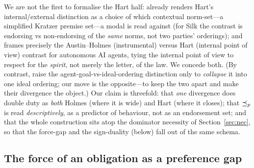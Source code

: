We are not the first to formalise the Hart half:  already renders Hart's
internal/external distinction as a choice of which contextual norm-set---a simplified
Kratzer premise set---a modal is read against (for Silk the contrast is endorsing vs
non-endorsing of the \emph{same} norms, not two parties' orderings); and 
frames precisely the Austin--Holmes (instrumental) versus Hart (internal point of view)
contrast for autonomous AI agents, tying the internal point of view to respect for the
\emph{spirit}, not merely the letter, of the law. We concede both. (By contrast,
 raise the agent-goal-vs-ideal-ordering distinction only to
\emph{collapse} it into one ideal ordering; our move is the opposite---to keep the two
apart and make their divergence the object.) Our claim is threefold: that
\emph{one} divergence does double duty as \emph{both} Holmes (where it is wide) and Hart
(where it closes); that $\preceq_{p}$ is read \emph{descriptively}, as a predictor of
behaviour, not as an endorsement set; and that the whole construction sits atop the
dominator necessity of Section~\ref{sec:nec}, so that the force-gap and the
sign-duality (below) fall out of the same schema.

\subsection{The force of an obligation as a preference gap}
\label{sec:force}

